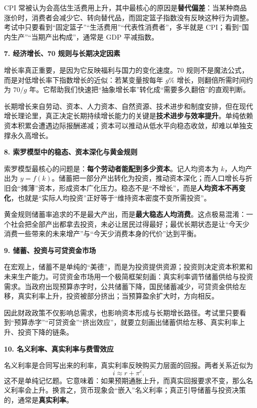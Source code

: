 CPI 常被认为会高估生活费用上升，其中最核心的原因是\textbf{替代偏差}：当某种商品涨价时，消费者会减少它、转向替代品，而固定篮子指数没有反映这种行为调整。考试中只要看到“固定篮子”“生活费用”“代表性消费者”，多半就是 CPI；看到“国内生产”“当期产出构成”，通常是 GDP 平减指数。

\textbf{7. 经济增长、70 规则与长期决定因素}

增长率真正重要，是因为它反映福利与国力的变化速度。70 规则不是魔法公式，而是对低增长率下指数增长的近似：若某变量按每年 $g\%$ 增长，则翻倍所需时间约为 $70/g$ 年。它帮助我们快速把“抽象增长率”转化成“需要多久翻倍”的直观判断。

长期增长来自劳动、资本、人力资本、自然资源、技术进步和制度安排，但在现代增长理论里，真正决定长期持续增长能力的关键是\textbf{技术进步与效率提升}。单纯依赖资本积累会遭遇边际报酬递减；资本可以推动从低水平向稳态收敛，却难以单独支撑永久高增长。

\textbf{8. 索罗模型中的稳态、资本深化与黄金规则}

索罗模型最核心的问题是：\textbf{每个劳动者能配到多少资本}。记人均资本为 $k$，人均产出为 $y=f(k)$。储蓄把一部分产出转化为投资，推动资本深化；而人口增长与折旧会“摊薄”资本，形成资本广化压力。稳态不是“不增长”，而是\textbf{人均资本不再变化}，也就是“实际人均投资”正好等于“维持资本密度不变所需投资”。

黄金规则储蓄率追求的不是最大产出，而是\textbf{最大稳态人均消费}。这点极易混淆：一个社会把全部产出都拿去投资，未必让居民过得最好；最优长期状态是让“今天少消费一些带来的未来增产”与“今天少消费本身的代价”达到平衡。

\textbf{9. 储蓄、投资与可贷资金市场}

在宏观上，储蓄不是单纯的“美德”，而是为投资提供资源；投资则决定资本积累和未来生产能力。可贷资金市场用一个极简框架刻画：真实利率调节储蓄供给与投资需求。当政府出现预算赤字时，公共储蓄下降，国民储蓄减少，可贷资金供给左移，真实利率上升，投资被部分挤出；当预算盈余扩大时，方向相反。

因此财政政策不仅影响总需求，也影响资本形成与长期增长路径。考试里只要看到“预算赤字”“可贷资金”“挤出效应”，就要立刻画出储蓄供给左移、真实利率上升、投资下降的链条。

\textbf{10. 名义利率、真实利率与费雪效应}

名义利率是合同写出来的利率，真实利率反映购买力层面的回报。两者关系近似为
\[
i \approx r + \pi^e.
\]
这不是单纯记忆题。它意味着：如果预期通胀上升，而真实回报要求不变，那么名义利率会上升。换言之，货币现象会“嵌入”名义利率；真正引导储蓄与投资决策的，通常是\textbf{真实利率}。


